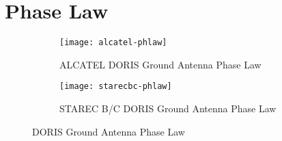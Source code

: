 \section{Phase Law}

\begin{figure}
\begin{subfigure}{0.45\textwidth}
  \centering
  \texttt{[image: alcatel-phlaw]}  
  \caption{\scriptsize ALCATEL DORIS Ground Antenna Phase Law}
  \label{fig:pcv-alcatel}
\end{subfigure}
\begin{subfigure}{0.45\textwidth}
  \centering
  \texttt{[image: starecbc-phlaw]}  
  \caption{\scriptsize STAREC B/C DORIS Ground Antenna Phase Law}
  \label{fig:pcv-starec}
\end{subfigure}
\caption{DORIS Ground Antenna Phase Law}
\label{fig:ground-antenna-phase-law}
\end{figure}